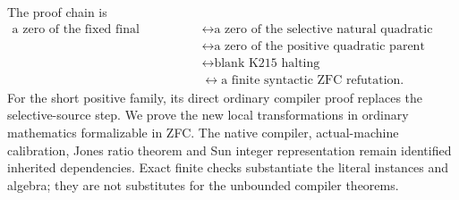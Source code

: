\documentclass[11pt]{article}
\begin{document}
The proof chain is
\[
\begin{split}
\text{a zero of the fixed final polynomial}
&\longleftrightarrow\text{a zero of the selective natural quadratic source}\\
&\longleftrightarrow\text{a zero of the positive quadratic parent}\\
&\longleftrightarrow\text{blank K215 halting}\\
&\longleftrightarrow\text{a finite syntactic ZFC refutation}.
\end{split}
\]
For the short positive family, its direct ordinary compiler proof replaces
the selective-source step. We prove the new local transformations in ordinary
mathematics formalizable in ZFC. The native compiler, actual-machine
calibration, Jones ratio theorem and Sun integer representation remain
identified inherited dependencies. Exact finite checks substantiate the
literal instances and algebra; they are not substitutes for the unbounded
compiler theorems.














\end{document}
